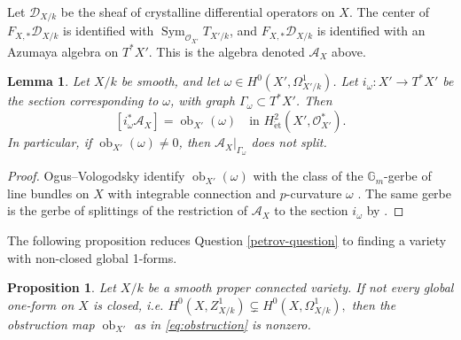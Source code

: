\documentclass[10pt,a4paper]{amsart}
\newtheorem{lemma}[theorem]{Lemma}
\newtheorem{proposition}[theorem]{Proposition}
\newcommand{\DD}{\mathcal D}
\newcommand{\Gm}{\mathbb G_m}
\begin{document}
Let $\DD_{X/k}$ be the sheaf of crystalline differential operators on $X$.
 The center
of \(F_{X,*}\DD_{X/k}\) is identified with
\(\operatorname{Sym}_{\mathcal O_{X'}}T_{X'/k}\), and 
\(F_{X,*}\DD_{X/k}\) is identified with an Azumaya algebra on \(T^*X'\).  This is the algebra
denoted \(\mathcal A_X\) above.

\begin{lemma}\label{lem:graph}
Let \(X/k\) be smooth, and let
\(\omega\in H^0(X',\Omega^1_{X'/k})\).  Let
\(
i_\omega\colon X'\longrightarrow T^*X'
\)
be the section corresponding to \(\omega\), with graph
\(\Gamma_\omega\subset T^*X'\).  Then
\[
[i_\omega^*\mathcal A_X]
=\operatorname{ob}_{X'}(\omega)
\quad\text{in } H^2_{\mathrm{\acute et}}(X',\mathcal O_{X'}^*).
\]
In particular, if \(\operatorname{ob}_{X'}(\omega)\ne 0\), then
\(\mathcal A_X|_{\Gamma_\omega}\) does not split.
\end{lemma}

\begin{proof}
Ogus--Vologodsky identify \(\operatorname{ob}_{X'}(\omega)\) with the class of
the \(\Gm\)-gerbe of line bundles on \(X\) with integrable connection and
\(p\)-curvature \(\omega\) \cite[Proposition 4.2]{OV}.  The same gerbe is the gerbe of splittings of the restriction of
\(\mathcal A_X\) to the section \(i_\omega\) by \cite[Remark 4.3]{OV}.  
\end{proof}

The following proposition reduces Question \ref{petrov-question} to finding a variety with non-closed global 1-forms.

\begin{proposition}\label{prop:dimension}
Let \(X/k\) be a smooth proper connected variety.  If not every global
one-form on \(X\) is closed, i.e.
\(
H^0(X,Z^1_{X/k})\subsetneq H^0(X,\Omega^1_{X/k}),
\)
then the obstruction map
\(
\operatorname{ob}_{X'}\) as in \eqref{eq:obstruction}
is nonzero.
\end{proposition}
\end{document}
